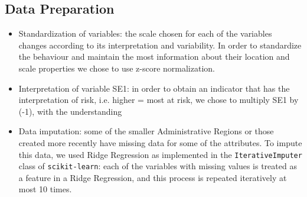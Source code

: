 \documentclass[conference]{IEEEtran}
\begin{document}

\subsection{Data Preparation}
\begin{itemize}
    \item Standardization of variables: the scale chosen for each of the variables changes according to its interpretation and variability. In order to standardize the behaviour and maintain the most information about their location and scale properties we chose to use z-score normalization.

    \item Interpretation of variable SE1: in order to obtain an indicator that has the interpretation of risk, i.e. higher = most at risk, we chose to multiply SE1 by (-1), with the understanding 

    
    \item Data imputation: some of the smaller Administrative Regions or those created more recently have missing data for some of the attributes. To impute this data, we used Ridge Regression as implemented in the \texttt{IterativeImputer} class of \texttt{scikit-learn}: each of the variables with missing values is treated as a feature in a Ridge Regression, and this process is repeated iteratively at most 10 times.




\end{itemize}
\end{document}
